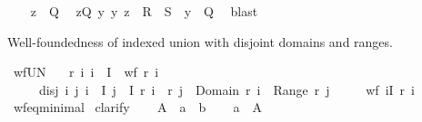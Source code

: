 \begin{isabellebody}
\isanewline
\ \ \isamarkupfalse%
\ {\isacartoucheopen}z\ {\isasymin}\ {\isacharquery}{\kern0pt}Q{\isacharprime}{\kern0pt}{\isacartoucheclose}\ \isamarkupfalse%
\ {\isachardoublequoteopen}{\isasymexists}z{\isasymin}Q{\isachardot}{\kern0pt}\ {\isasymforall}y{\isachardot}{\kern0pt}\ {\isacharparenleft}{\kern0pt}y{\isacharcomma}{\kern0pt}\ z{\isacharparenright}{\kern0pt}\ {\isasymin}\ R\ {\isasymunion}\ S\ {\isasymlongrightarrow}\ y\ {\isasymnotin}\ Q{\isachardoublequoteclose}\ \isamarkupfalse%
\ blast\isanewline
{}\isamarkupfalse%
%
\endisatagproof
{\isafoldproof}%
%
\isadelimproof
%
\endisadelimproof
%
\begin{isamarkuptext}%
Well-foundedness of indexed union with disjoint domains and ranges.%
\end{isamarkuptext}\isamarkuptrue%
\isamarkupfalse%
\ wf{\isacharunderscore}{\kern0pt}UN{\isacharcolon}{\kern0pt}\isanewline
\ \ \ r{\isacharcolon}{\kern0pt}\ {\isachardoublequoteopen}{\isasymAnd}i{\isachardot}{\kern0pt}\ i\ {\isasymin}\ I\ {\isasymLongrightarrow}\ wf\ {\isacharparenleft}{\kern0pt}r\ i{\isacharparenright}{\kern0pt}{\isachardoublequoteclose}\isanewline
\ \ \ \ \ disj{\isacharcolon}{\kern0pt}\ {\isachardoublequoteopen}{\isasymAnd}i\ j{\isachardot}{\kern0pt}\ {\isasymlbrakk}i\ {\isasymin}\ I{\isacharsemicolon}{\kern0pt}\ j\ {\isasymin}\ I{\isacharsemicolon}{\kern0pt}\ r\ i\ {\isasymnoteq}\ r\ j{\isasymrbrakk}\ {\isasymLongrightarrow}\ Domain\ {\isacharparenleft}{\kern0pt}r\ i{\isacharparenright}{\kern0pt}\ {\isasyminter}\ Range\ {\isacharparenleft}{\kern0pt}r\ j{\isacharparenright}{\kern0pt}\ {\isacharequal}{\kern0pt}\ {\isacharbraceleft}{\kern0pt}{\isacharbraceright}{\kern0pt}{\isachardoublequoteclose}\isanewline
\ \ \ {\isachardoublequoteopen}wf\ {\isacharparenleft}{\kern0pt}{\isasymUnion}i{\isasymin}I{\isachardot}{\kern0pt}\ r\ i{\isacharparenright}{\kern0pt}{\isachardoublequoteclose}\isanewline
%
\isadelimproof
\ \ %
\endisadelimproof
%
\isatagproof
{}\isamarkupfalse%
\ wf{\isacharunderscore}{\kern0pt}eq{\isacharunderscore}{\kern0pt}minimal\isanewline
{}\isamarkupfalse%
\ clarify\isanewline
\ \ \isamarkupfalse%
\ A\ \ a\ {\isacharcolon}{\kern0pt}{\isacharcolon}{\kern0pt}\ {\isachardoublequoteopen}{\isacharprime}{\kern0pt}b{\isachardoublequoteclose}\isanewline
\ \ \isamarkupfalse%
\ {\isachardoublequoteopen}a\ {\isasymin}\ A{\isachardoublequoteclose}\isanewline

\end{isabellebody}
